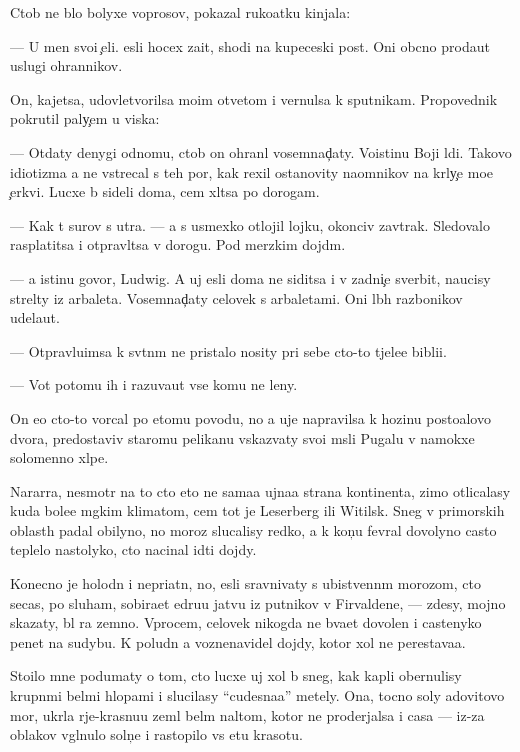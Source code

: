 \documentclass[10pt]{book}
\begin{document}
Ctob{\yi} ne b{\yi}lo bolyxe voprosov, pokazal ruko{\y}atku kinjala:

— U men{\ia} svo{\y}i {\c}eli. {\Y}esli hocex za{\x}it{\yi}, shodi na kupeceski{\y} post. Oni ob{\yi}cno proda{\y}ut uslugi ohrannikov.

On, kajetsa, udovletvorilsa mo{\y}im otvetom i vernulsa k sputnikam. Pro\-po\-ved\-nik pokrutil paly{\c}em u viska:

— Otdaty denygi odnomu, ctob{\yi} on ohran{\ia}l vosemnad{\c}aty. Voistinu Boj{\y}i l{\io}di. Takovo idiotizma {\y}a ne vstrecal s teh por, kak rexil ostanovity na{\y}om\-ni\-kov na kr{\yi}ly{\c}e mo{\y}e{\y} {\c}erkvi. Lucxe b{\yi} sideli doma, cem xl{\ia}tsa po dorogam.

— Kak t{\yi} surov s utra. — {\Y}a s usmexko{\y} otlojil lojku, okonciv zavtrak. Sledovalo rasplatitsa i otpravl{\ia}tsa v do\-ro\-gu. Pod merzkim dojd{\e}m.

— {\Y}a istinu govor{\io}, Ludwig. A uj {\y}esli doma ne siditsa i v zadni{\c}e sverbit, naucisy strel{\ia}ty iz arbaleta. Vosemnad{\c}aty celovek s arbaletami. Oni l{\io}b{\yi}h razbo{\y}nikov udela{\y}ut.

— Otpravl{\ia}{\y}u{\x}imsa k sv{\ia}t{\yi}n{\ia}m ne pristalo nosity pri sebe cto-to t{\ia}jele{\y}e bibli{\y}i.

— Vot potomu ih i razuva{\y}ut vse komu ne leny.

On {\y}e{\x}o cto-to vorcal po etomu povodu, no {\y}a uje napravilsa k hoz{\ia}{\y}inu posto{\y}alovo dvora, predostaviv staromu pelikanu v{\yi}skaz{\yi}vaty svo{\y}i m{\yi}sli Pugalu v namokxe{\y} solomenno{\y} xl{\ia}pe.



Nararra, ne\-smo\-tr{\ia} na to cto eto ne sama{\y}a {\y}ujna{\y}a strana kontinenta, zimo{\y} otlicalasy kuda bole{\y}e m{\ia}gkim klimatom, cem tot je Leserberg ili Witilsk. Sneg v primorskih oblast{\ia}h padal obilyno, no moroz{\yi} slucalisy redko, a k kon{\c}u fevral{\ia} dovolyno casto teplelo nastolyko, cto nacinal idti dojdy.

Konecno je holodn{\yi}{\y} i nepri{\y}atn{\yi}{\y}, no, {\y}esli sravnivaty s ubi{\y}stvenn{\yi}m morozom, cto se{\y}cas, po sluham, sobira{\y}et {\x}edru{\y}u jatvu iz putnikov v Firvaldene, — zdesy, mojno skazaty, b{\yi}l ra{\y} zemno{\y}. Vprocem, celovek nikogda ne b{\yi}\-va\-{\y}et do\-vo\-len i castenyko pen{\ia}{\y}et na sudybu. K poludn{\io} {\y}a voznenavidel dojdy, kotor{\yi}{\y} xol ne perestava{\y}a.

Stoilo mne podumaty o tom, cto lucxe uj xol b{\yi} sneg, kak kapli obernulisy krup\-n{\yi}\-mi bel{\yi}mi hlop{\y}ami i slucilasy ``cudesna{\y}a'' metely. Ona, tocno soly {\Y}adovitovo mor{\ia}, ukr{\yi}la r{\yi}je-krasnu{\y}u zeml{\io} bel{\yi}m nal{\e}tom, kotor{\yi}{\y} ne proderjalsa i casa — iz-za oblakov v{\yi}gl{\ia}nulo soln{\c}e i rastopilo vs{\io} etu krasotu.
\end{document}
